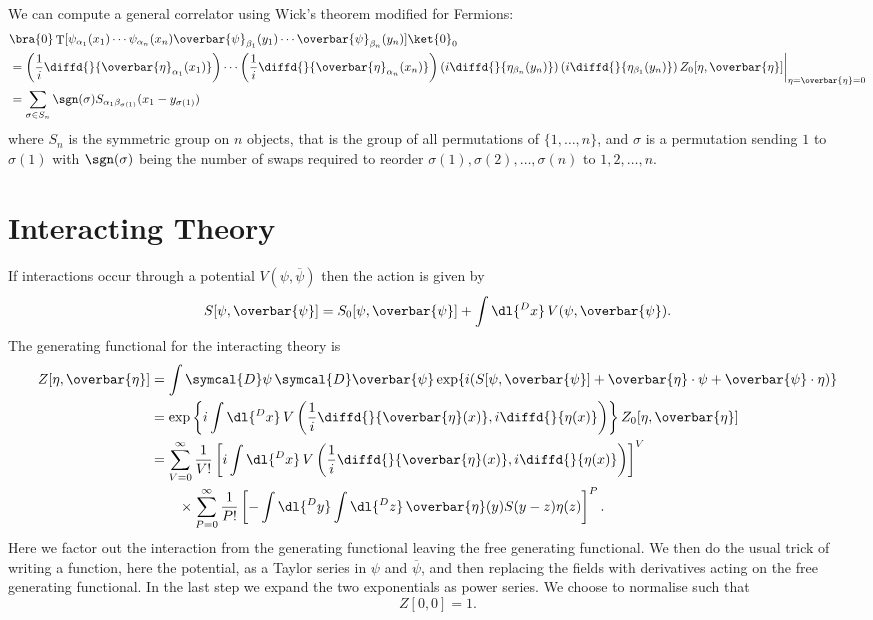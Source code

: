 \documentclass[fleqn]{NotesClass}
\DeclareMathOperator{\timeOrdering}{T}
\newcommand{\DL}[1]{\symcal{D}#1}
\newcommand{\DD}[1]{\,\symcal{D}#1}
\newcommand{\diracadjoint}[1]{\overbar{#1}}
\begin{document}
    We can compute a general correlator using Wick's theorem modified for Fermions:
    \begin{align}
        &\bra{0} \timeOrdering[\psi_{\alpha_1}(x_1) \dotsm \psi_{\alpha_n}(x_n) \diracadjoint{\psi}_{\beta_1}(y_1) \dotsm \diracadjoint{\psi}_{\beta_n}(y_n)] \ket{0}_0\\
        &= \left( \frac{1}{i} \diffd{}{\diracadjoint{\eta}_{\alpha_1}(x_1)} \right) \dotsm \left( \frac{1}{i} \diffd{}{\diracadjoint{\eta}_{\alpha_n}(x_n)} \right) \left( i \diffd{}{\eta_{\beta_n}(y_n)} \right) \left( i \diffd{}{\eta_{\beta_1}(y_n)} \right) Z_0[\eta, \diracadjoint{\eta}] \bigg|_{\eta = \diracadjoint{\eta} = 0}\\
        &= \sum_{\sigma \in S_n} \sgn(\sigma) S_{\alpha_1\beta_{\sigma(1)}}(x_1 - y_{\sigma(1)})
    \end{align}
    where \(S_n\) is the symmetric group on \(n\) objects, that is the group of all permutations of \(\{1, \dotsc, n\}\), and \(\sigma\) is a permutation sending \(1\) to \(\sigma(1)\) with \(\sgn(\sigma)\) being the number of swaps required to reorder \(\sigma(1), \sigma(2), \dotsc, \sigma(n)\) to \(1,2, \dotsc, n\).
    
    \section{Interacting Theory}
    If interactions occur through a potential \(V(\psi, \diracadjoint{\psi})\) then the action is given by
    \begin{equation}
        S[\psi, \diracadjoint{\psi}] = S_0[\psi, \diracadjoint{\psi}] + \int \dl{^Dx} \, V(\psi, \diracadjoint{\psi}).
    \end{equation}
    The generating functional for the interacting theory is
    \begin{align}
        Z[\eta, \diracadjoint{\eta}] &= \int \DL{\psi} \DD{\diracadjoint{\psi}} \exp\{i (S[\psi, \diracadjoint{\psi}] + \diracadjoint{\eta} \cdot \psi + \diracadjoint{\psi} \cdot \eta)\}\\
        &= \exp\left\{ i \int \dl{^Dx} \, V\left( \frac{1}{i} \diffd{}{\diracadjoint{\eta}(x)}, i \diffd{}{\eta(x)} \right) \right\} Z_{0}[\eta, \diracadjoint{\eta}]\\
        &= \sum_{V = 0}^{\infty} \frac{1}{V!} \left[ i \int \dl{^Dx} \, V\left( \frac{1}{i} \diffd{}{\diracadjoint{\eta}(x)}, i \diffd{}{\eta(x)} \right) \right]^V\\
        &\qquad \times \sum_{P = 0}^{\infty} \frac{1}{P!} \left[ -\int \dl{^Dy} \int\dl{^Dz} \, \diracadjoint{\eta}(y) S(y - z) \eta(z) \right]^P.
    \end{align}
    Here we factor out the interaction from the generating functional leaving the free generating functional.
    We then do the usual trick of writing a function, here the potential, as a Taylor series in \(\psi\) and \(\diracadjoint{\psi}\), and then replacing the fields with derivatives acting on the free generating functional.
    In the last step we expand the two exponentials as power series.
    We choose to normalise such that
    \begin{equation}
        Z[0, 0] = 1.
    \end{equation}
    
\end{document}
